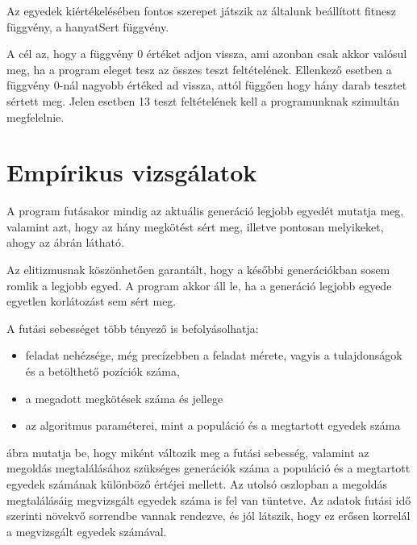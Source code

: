 \documentclass[12pt,a4paper,oneside]{report}
\begin{document}
	Az egyedek kiértékelésében fontos szerepet játszik az általunk beállított fitnesz függvény, a hanyatSert függvény.


	A cél az, hogy a függvény 0 értéket adjon vissza, ami azonban csak akkor valósul meg, ha a program eleget tesz az összes teszt feltételének.
	Ellenkező esetben a függvény 0-nál nagyobb értéked ad vissza, attól függően hogy hány darab tesztet sértett meg.
	Jelen esetben 13 teszt feltételének kell a programunknak szimultán megfelelnie.

	

\chapter{Empírikus vizsgálatok} %
	A program futásakor mindig az aktuális generáció legjobb egyedét mutatja meg, valamint azt, hogy az hány megkötést sért meg, illetve pontosan melyikeket, ahogy az   ábrán látható.


	Az elitizmusnak köszönhetően garantált, hogy a későbbi generációkban sosem romlik a legjobb egyed.
    A program akkor áll le, ha a generáció legjobb egyede egyetlen korlátozást sem sért meg.

	A futási sebességet több tényező is befolyásolhatja:

	\begin{itemize}
        \item feladat nehézsége, még precízebben a feladat mérete, vagyis a tulajdonságok és a betölthető pozíciók száma,
        \item a megadott megkötések száma és jellege
        \item az algoritmus paraméterei, mint a populáció és a megtartott egyedek száma
	\end{itemize}

	 ábra mutatja be, hogy miként változik meg a futási sebesség, valamint az megoldás megtalálásához szükséges generációk száma a populáció és a megtartott egyedek számának különböző értéjei mellett.
	Az utolsó oszlopban a megoldás megtalálásáig megvizsgált egyedek száma is fel van tüntetve. 
	Az adatok futási idő szerinti növekvő sorrendbe vannak rendezve, és jól látszik, hogy ez erősen korrelál a megvizsgált egyedek számával. 

\end{document}
